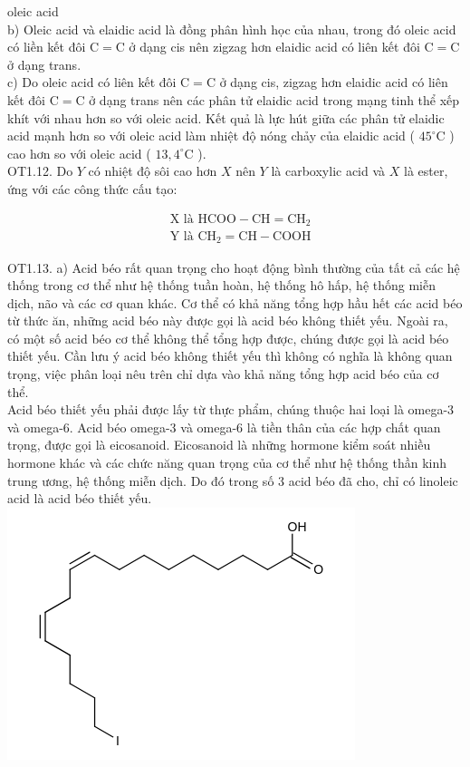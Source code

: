 \documentclass[10pt]{article}
\begin{document}
oleic acid\\
b) Oleic acid và elaidic acid là đồng phân hình học của nhau, trong đó oleic acid có liền kết đôi $\mathrm{C}=\mathrm{C}$ ở dạng cis nên zigzag hơn elaidic acid có liên kết đôi $\mathrm{C}=\mathrm{C}$ ở dạng trans.\\
c) Do oleic acid có liên kết đôi $\mathrm{C}=\mathrm{C}$ ở dạng cis, zigzag hơn elaidic acid có liên kết đôi $\mathrm{C}=\mathrm{C}$ ở dạng trans nên các phân tử elaidic acid trong mạng tinh thể xếp khít với nhau hơn so với oleic acid. Kết quả là lực hút giữa các phân tử elaidic acid mạnh hơn so với oleic acid làm nhiệt độ nóng chảy của elaidic acid ( $45^{\circ} \mathrm{C}$ ) cao hơn so với oleic acid ( $13,4^{\circ} \mathrm{C}$ ).\\
OT1.12. Do $Y$ có nhiệt độ sôi cao hơn $X$ nên $Y$ là carboxylic acid và $X$ là ester, ứng với các công thức cấu tạo:

$$
\begin{aligned}
& \mathrm{X} \text { là } \mathrm{HCOO}-\mathrm{CH}=\mathrm{CH}_{2} \\
& \mathrm{Y} \text { là } \mathrm{CH}_{2}=\mathrm{CH}-\mathrm{COOH}
\end{aligned}
$$

OT1.13. a) Acid béo rất quan trọng cho hoạt động bình thường của tất cả các hệ thống trong cơ thể như hệ thống tuần hoàn, hệ thống hô hấp, hệ thống miễn dịch, não và các cơ quan khác. Cơ thể có khả năng tổng hợp hầu hết các acid béo từ thức ăn, những acid béo này được gọi là acid béo không thiết yếu. Ngoài ra, có một số acid béo cơ thể không thể tổng hợp được, chúng được gọi là acid béo thiết yếu. Cần lưu ý acid béo không thiết yếu thì không có nghĩa là không quan trọng, việc phân loại nêu trên chỉ dựa vào khả năng tổng hợp acid béo của cơ thể.\\
Acid béo thiết yếu phải được lấy từ thực phẩm, chúng thuộc hai loại là omega-3 và omega-6. Acid béo omega-3 và omega-6 là tiền thân của các hợp chất quan trọng, được gọi là eicosanoid. Eicosanoid là những hormone kiểm soát nhiều hormone khác và các chức năng quan trọng của cơ thể như hệ thống thần kinh trung ương, hệ thống miễn dịch. Do đó trong số 3 acid béo đã cho, chỉ có linoleic acid là acid béo thiết yếu.\\
\includegraphics{smile-f7d062b4ad83a9c8dd37a4cfa49ce8f46755cf7f}
\end{document}
